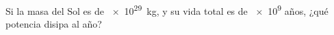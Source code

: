 \documentclass[./../main.tex]{subfiles}
\begin{document}
    \begin{exercise}
        Si la masa del Sol es de \qty{e29}{\kg}, y su vida total es de \num{e9} años, ¿qué potencia disipa al año?
    \end{exercise}
\end{document}
